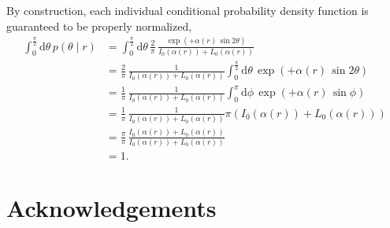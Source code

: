 \documentclass[
  letterpaper,
  DIV=11,
  numbers=noendperiod]{scrartcl}
\begin{document}
By construction, each individual conditional probability density
function is guaranteed to be properly normalized, \begin{align*}
\int_{0}^{\frac{\pi}{2}} \mathrm{d} \theta \, p(\theta \mid r)
&=
\int_{0}^{\frac{\pi}{2}} \mathrm{d} \theta \,
\frac{2}{\pi} \,
\frac{
\exp \left( + \alpha(r) \, \sin 2 \theta \right)
}{
  I_{0} \left( \alpha(r) \right) + L_{0} \left( \alpha(r) \right)
}
\\
&=
\frac{2}{\pi} \,
\frac{1}{
  I_{0} \left( \alpha(r) \right) + L_{0} \left( \alpha(r) \right)
}
\int_{0}^{\frac{\pi}{2}} \mathrm{d} \theta \,
\exp \left( + \alpha(r) \, \sin 2 \theta \right)
\\
&=
\frac{1}{\pi} \,
\frac{1}{
  I_{0} \left( \alpha(r) \right) + L_{0} \left( \alpha(r) \right)
}
\int_{0}^{\pi} \mathrm{d} \phi \,
\exp \left( + \alpha(r) \, \sin \phi \right)
\\
&=
\frac{1}{\pi} \,
\frac{1}{
  I_{0} \left( \alpha(r) \right) + L_{0} \left( \alpha(r) \right)
}
\pi \left(
  I_{0} \left( \alpha(r) \right) + L_{0} \left( \alpha(r) \right)
\right)
\\
&=
\frac{\pi}{\pi} \,
\frac{
  I_{0} \left( \alpha(r) \right) + L_{0} \left( \alpha(r) \right)
}{
  I_{0} \left( \alpha(r) \right) + L_{0} \left( \alpha(r) \right)
}
\\
&=
1.
\end{align*}

\section*{Acknowledgements}\label{acknowledgements}
\end{document}
